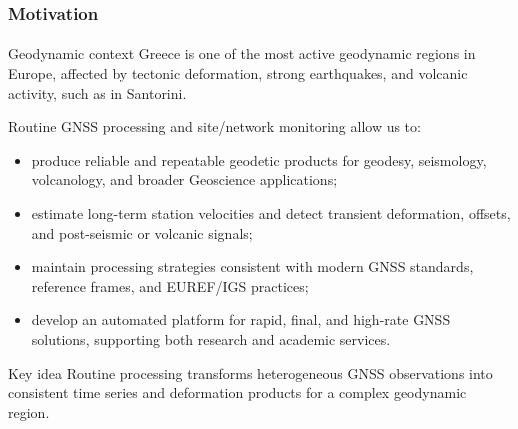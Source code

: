 \begin{frame}\frametitle{Motivation}\framesubtitle{}
\vskip-0.7cm
\begin{block}{Geodynamic context}
Greece is one of the most active geodynamic regions in Europe, affected by
tectonic deformation, strong earthquakes, and volcanic activity, such as in
Santorini.
\end{block}


Routine GNSS processing and site/network monitoring allow us to:

\begin{itemize}
  \item produce reliable and repeatable geodetic products for geodesy,
        seismology, volcanology, and broader Geoscience applications;
  \item estimate long-term station velocities and detect transient deformation,
        offsets, and post-seismic or volcanic signals;
  \item maintain processing strategies consistent with modern GNSS standards,
        reference frames, and EUREF/IGS practices;
  \item develop an automated platform for rapid, final, and high-rate GNSS
        solutions, supporting both research and academic services.
\end{itemize}

\vfill

\begin{alertblock}{Key idea}
Routine processing transforms heterogeneous GNSS observations into consistent
time series and deformation products for a complex geodynamic region.
\end{alertblock}

\end{frame}
%

